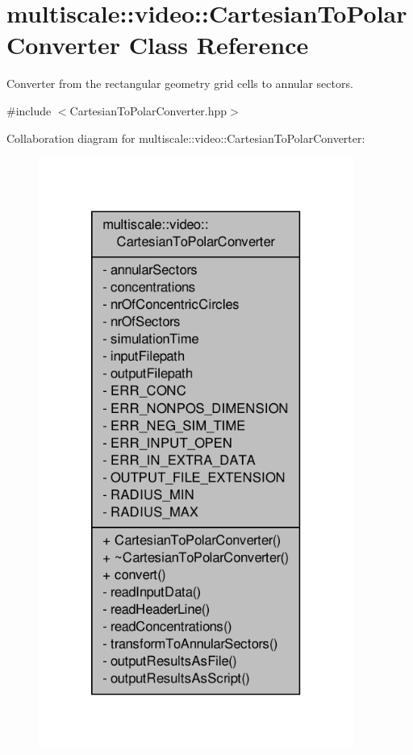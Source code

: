 \hypertarget{classmultiscale_1_1video_1_1CartesianToPolarConverter}{\section{multiscale\-:\-:video\-:\-:Cartesian\-To\-Polar\-Converter Class Reference}
\label{classmultiscale_1_1video_1_1CartesianToPolarConverter}
}


Converter from the rectangular geometry grid cells to annular sectors.  




{\ttfamily \#include $<$Cartesian\-To\-Polar\-Converter.\-hpp$>$}



Collaboration diagram for multiscale\-:\-:video\-:\-:Cartesian\-To\-Polar\-Converter\-:\nopagebreak
\begin{figure}[H]
\begin{center}
\leavevmode
\includegraphics[height=550pt]{classmultiscale_1_1video_1_1CartesianToPolarConverter__coll__graph}
\end{center}
\end{figure}
